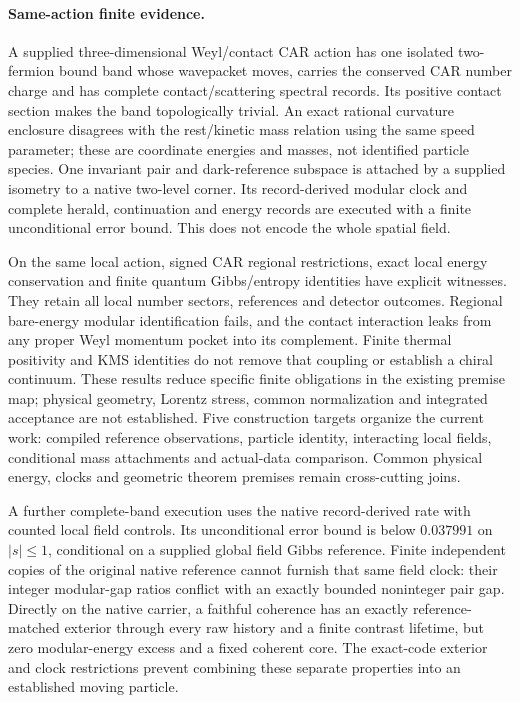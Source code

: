 \paragraph{Same-action finite evidence.}
A supplied three-dimensional Weyl/contact CAR action has one isolated
two-fermion bound band whose wavepacket moves, carries the conserved CAR
number charge and has complete contact/scattering spectral records.
Its positive contact section makes the band topologically trivial.
An exact rational curvature enclosure disagrees with the rest/kinetic
mass relation using the same speed parameter; these are coordinate
energies and masses, not identified particle species. One invariant pair
and dark-reference subspace is attached by a supplied isometry to a
native two-level corner. Its record-derived modular clock and complete
herald, continuation and energy records are executed with a finite
unconditional error bound. This does not encode the whole spatial field.

On the same local action, signed CAR regional restrictions, exact local
energy conservation and finite quantum Gibbs/entropy identities have
explicit witnesses. They retain all local number sectors, references and
detector outcomes. Regional bare-energy modular identification fails, and
the contact interaction leaks from any proper Weyl momentum pocket into
its complement. Finite thermal positivity and KMS identities do not remove
that coupling or establish a chiral continuum. These results reduce
specific finite obligations in the existing premise map; physical
geometry, Lorentz stress, common normalization and integrated acceptance
are not established. Five construction targets organize the current work:
compiled reference observations, particle identity, interacting local fields,
conditional mass attachments and actual-data comparison. Common physical
energy, clocks and geometric theorem premises remain cross-cutting joins.

A further complete-band execution uses the native record-derived rate with
counted local field controls. Its unconditional error bound is below
$0.037991$ on $|s|\le1$, conditional on a supplied global field Gibbs
reference. Finite independent copies of the original native reference
cannot furnish that same field clock: their integer modular-gap ratios
conflict with an exactly bounded noninteger pair gap. Directly on the
native carrier, a faithful coherence has an exactly reference-matched
exterior through every raw history and a finite contrast lifetime, but
zero modular-energy excess and a fixed coherent core. The exact-code
exterior and clock restrictions prevent combining these separate
properties into an established moving particle.


